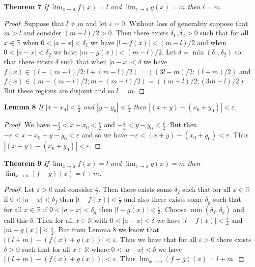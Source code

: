 \documentclass{article}
\begin{document}
\begin{flushleft}
\textbf{Theorem 7}
\textsl{If $\lim_{x \rightarrow a} f(x) = l$ and $\lim_{x \rightarrow a} g(x) = m$ then $l=m$.}
\begin{proof}
Suppose that $l \neq m$ and let $\varepsilon = 0$. Without loss of generality suppose that $m>l$ and consider $(m-l)/2 > 0$. Then there exists $\delta_1, \delta_2 > 0$ such that for all $x \in \mathbb{R}$ when $0 < |a-x| < \delta_1$ we have $|l-f(x)| < (m-l)/2$ and when $0 < |a-x| < \delta_2$ we have $|m-g(x)| < (m-l)/2$. Let $\delta = \min (\delta_1 , \delta_2)$ so that there exists $\delta$ such that when $|a-x| < \delta$ we have $f(x) \in (l - (m-l)/2 ; l + (m-l)/2) = ((3l-m)/2 ; (l+m)/2)$ and $f(x) \in (m-(m-l)/2 ; m+(m-l)/2)=((m+l)/2 ; (3m-l)/2)$. But these regions are disjoint and so $l=m$.
\end{proof}

\textbf{Lemma 8}
\textsl{If $|x-x_0| < \frac{\varepsilon}{2}$ and $|y-y_0| < \frac{\varepsilon}{2}$ then $|(x+y) - (x_0+y_0)| < \varepsilon$.}
\begin{proof}
We have $-\frac{\varepsilon}{2} < x-x_0 < \frac{\varepsilon}{2}$ and $-\frac{\varepsilon}{2} < y-y_0 < \frac{\varepsilon}{2}$. But then $-\varepsilon < x-x_0 + y-y_0 < \varepsilon$ and so we have $-\varepsilon < (x+y) - (x_0+y_0) < \varepsilon$. Thus $|(x+y) - (x_0+y_0)| < \varepsilon$.
\end{proof}

\textbf{Theorem 9}
\textsl{If $\lim_{x \rightarrow a} f(x) = l$ and $\lim_{x \rightarrow a} g(x) = m$ then $\lim_{x \rightarrow a} (f+g)(x) = l+m$.}
\begin{proof}
Let $\varepsilon > 0$ and consider $\frac{\varepsilon}{2}$. Then there exists some $\delta_f$ such that for all $x \in \mathbb{R}$ if $0 < |a - x| < \delta_f$ then $|l - f(x)| < \frac{\varepsilon}{2}$ and also there exists some $\delta_g$ such that for all $x \in \mathbb{R}$ if $0 < |a - x| < \delta_g$ then $|l - g(x)| < \frac{\varepsilon}{2}$. Choose $\min (\delta_f, \delta_g)$ and call this $\delta$. Then for all $x \in \mathbb{R}$ with $0 < |a-x| < \delta$ we have $|l - f(x)| < \frac{\varepsilon}{2}$ and $|m - g(x)| < \frac{\varepsilon}{2}$. But from Lemma 8 we know that $|(l+m)-(f(x)+g(x))| < \varepsilon$. Thus we have that for all $\varepsilon > 0$ there exists $\delta > 0$ such that for all $x \in \mathbb{R}$ where $0 < |a-x| < \delta$ we have $|(l+m)-(f(x)+g(x))| < \varepsilon$. Thus $\lim_{x \rightarrow a} (f+g)(x) = l+m$.
\end{proof}


\end{flushleft}
\end{document}
